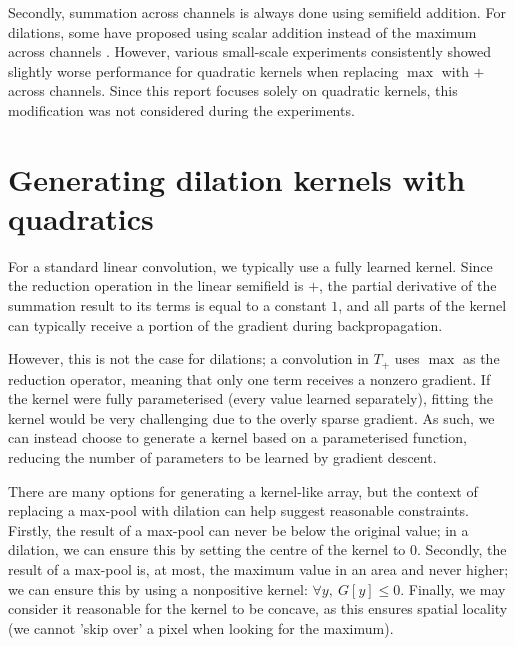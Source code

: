 \documentclass[a4paper, 12pt]{report}
\begin{document}
Secondly, summation across channels is always done using semifield addition. For dilations, some have proposed using scalar addition instead of the maximum across channels \cite{koenbsc, fan2021alternative}. However, various small-scale experiments consistently showed slightly worse performance for quadratic kernels when replacing $\max$ with $+$ across channels. Since this report focuses solely on quadratic kernels, this modification was not considered during the experiments.



\newpage
\section{Generating dilation kernels with quadratics}
\label{sec:generating-quadratics}
For a standard linear convolution, we typically use a fully learned kernel. Since the reduction operation in the linear semifield is $+$, the partial derivative of the summation result to its terms is equal to a constant $1$, and all parts of the kernel can typically receive a portion of the gradient during backpropagation.

However, this is not the case for dilations; a convolution in $T_+$ uses $\max$ as the reduction operator, meaning that only one term receives a nonzero gradient. If the kernel were fully parameterised (every value learned separately), fitting the kernel would be very challenging due to the overly sparse gradient. As such, we can instead choose to generate a kernel based on a parameterised function, reducing the number of parameters to be learned by gradient descent.

There are many options for generating a kernel-like array, but the context of replacing a max-pool with dilation can help suggest reasonable constraints. Firstly, the result of a max-pool can never be below the original value; in a dilation, we can ensure this by setting the centre of the kernel to $0$. Secondly, the result of a max-pool is, at most, the maximum value in an area and never higher; we can ensure this by using a nonpositive kernel: $\forall y,~G[y] \leq 0$. Finally, we may consider it reasonable for the kernel to be concave, as this ensures spatial locality (we cannot 'skip over' a pixel when looking for the maximum).
\end{document}
